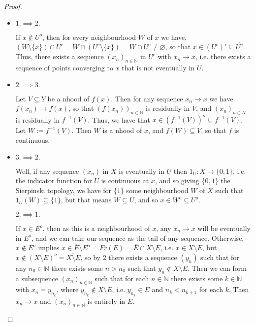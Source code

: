 \documentclass[12pt]{extarticle}
\newcommand{\set}[1]{\{#1\}}
\newcommand{\N}{\mathbb{N}}
\newcommand{\<}{\langle}
\renewcommand{\>}{\rangle}
\renewcommand{\emptyset}{\varnothing}
\theoremstyle{definition}
\begin{document}
\begin{proof}
  \begin{itemize}
  \item
    $1. \implies 2.$
    
    If $x \not \in U^o$, then for every neighbourhood $W$ of $x$ we have, $(W \setminus \set{x}) \cap U^c = W\cap (U^c \setminus \set{x}) = W \cap U^c \neq \emptyset$,
    so that $x \in (U^c)' \subseteq \overline{U^c}$. Thus, there exists a sequence $(x_n)_{n \in \N}$ in $U^c$ with $x_n \to x$, i.e. there exists a sequence of points converging to $x$ that is not eventually in $U$. 
  \item
    $2. \implies 3.$
    
    Let $V \subseteq Y$ be a nhood of $f(x)$. Then for any sequence $x_n \to x$ we have $f(x_n) \to f(x)$, so that $(f(x_n))_{n \in \N}$ is residually in $V$,
    and $(x_n)_{n \in N}$ is residually in $f^{-1}(V)$. Thus, we have that $x \in (f^{-1}(V))^o \subseteq f^{-1}(V)$. Let $W:=f^{-1}(V)$. Then $W$ is a nhood of $x$,
    and $f(W) \subseteq V$, so that $f$ is continuous. 
  \item
    $3. \implies 2.$

    Well, if any sequence $(x_n)$ in $X$ is eventually in $U$ then $1_U:X \to \set{0,1}$, i.e. the indicator function for $U$ is continuous at $x$, and so
    giving $\set{0,1}$ the Sierpinski topology, we have for $\set{1}$ some neighbourhood $W$ of $X$ such that $1_U(W) \subseteq \set{1}$, but that means $W \subseteq U$,
    and so $x \in W^o \subseteq U^o$.

    $2. \implies 1.$

    If $x \in E^o$, then as this is a neighbourhood of $x$, any $x_n \to x$ will be eventually in $E^o$, and we can take our sequence as the tail of any sequence.
    Otherwise, $x \not \in E^o$ implies $x \in \overline{E} \setminus E^o = Fr(E) = \overline{E} \cap \overline{X \setminus E}$, i.e. $x \in \overline{X \setminus E}$,
    but $x \not \in (X \setminus E)^o = \overline{X \setminus E}$, so by $2$ there exists a sequence $(y_n)$ such that for any $n_0 \in \N$ there exists some $n > n_0$ such
    that $y_n \not \in X \setminus E$. Then we can form a subsequence $(x_n)_{n \in \N}$ such that for each $n \in \N$ there exists some $k \in \N$ with $x_n = y_{n_k}$,
    where $y_{n_k} \not \in X \setminus E$, i.e. $y_{n_k} \in E$ and $n_k < n_{k+1}$ for each $k$. Then $x_n \to x$ and $(x_n)_{n \in \N}$ is entirely in $E$. 
     
  \end{itemize}
\end{proof}
\end{document}
